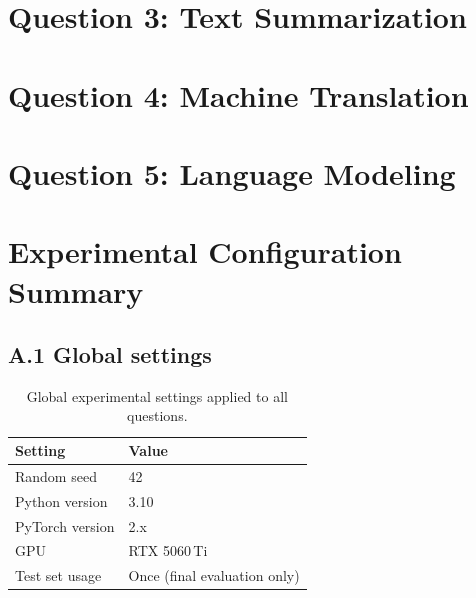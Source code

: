 \documentclass[12pt, a4paper]{article}
\begin{document}
\newpage
\section{Question 3: Text Summarization}


\newpage
\section{Question 4: Machine Translation}


\newpage
\section{Question 5: Language Modeling}


\newpage



\newpage
\appendix
\section{Experimental Configuration Summary}

\subsection*{A.1 Global settings}
\begin{table}[H]
\centering
\caption{Global experimental settings applied to all questions.}
\begin{tabular}{ll}
\toprule
\textbf{Setting} & \textbf{Value} \\
\midrule
Random seed & 42 \\
Python version & 3.10 \\
PyTorch version & 2.x \\
GPU & RTX 5060\,Ti \\
Test set usage & Once (final evaluation only) \\
\bottomrule
\end{tabular}
\end{table}
\end{document}
